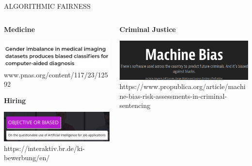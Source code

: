 \documentclass[11pt,compress,t,notes=noshow, xcolor=table]{beamer}
\begin{document}
\begin{vbframe}{ALGORITHMIC FAIRNESS}
\begin{columns}
\begin{column}{0.5\textwidth}
\begin{center}
 \vspace{-0.5cm}

 \textbf{Medicine}

 \includegraphics[height=0.2\textheight]{figures/gender_imbalance.png}
 \tiny{www.pnas.org/content/117/23/12592}

 \vspace{1.5cm}

 \textbf{Hiring}

 \includegraphics[height=0.2\textheight]{figures/hiring.png}
 \tiny{https://interaktiv.br.de/ki-bewerbung/en/}

\end{center}
\end{column}
\begin{column}{0.5\textwidth}
\begin{center}
 \vspace{-0.5cm}

 \textbf{Criminal Justice}

 \includegraphics[height=0.2\textheight]{figures/compas.png}
 \tiny{{https://www.propublica.org/article/machine-bias-risk-assessments-in-criminal-sentencing}}


\end{center}
\end{column}
\end{columns}
\end{vbframe}
\end{document}
